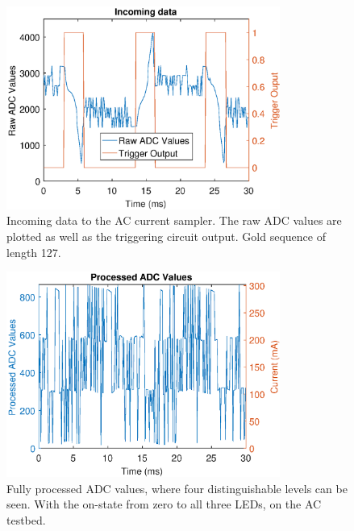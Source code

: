 \begin{figure}
  \centering
  \includegraphics[width=0.8\textwidth]{chapters/evaluation-chapters/hardware/ac/raw-ac-testbed-adc-data.eps}
    \caption{Incoming data to the AC current sampler. The raw ADC values are plotted as well as the triggering circuit output. Gold sequence of length 127.}
  \label{fig:raw-ac-testbed-adc-data}
\end{figure}


\begin{figure}
  \centering
  \includegraphics[width=0.8\textwidth]{chapters/evaluation-chapters/hardware/ac/processed-ac-testbed-adc-data.eps}
    \caption{Fully processed ADC values, where four distinguishable levels can be seen. With the on-state from zero to all three LEDs, on the AC testbed.}
  \label{fig:processed-ac-testbed-adc-data}
\end{figure}



